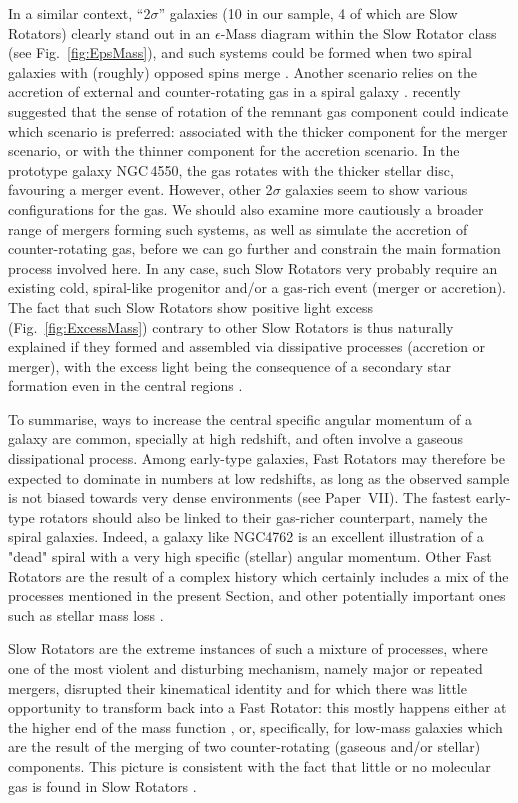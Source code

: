 \documentclass[useAMS,usenatbib,usegraphicx]{mn2e}
\begin{document}
In a similar context, ``2$\sigma$'' galaxies (10 in our sample, 4 of which are Slow Rotators)
clearly stand out in an $\epsilon$-Mass diagram within the Slow Rotator class (see Fig.~\ref{fig:EpsMass}),
and such systems could be formed when two spiral galaxies with (roughly) opposed spins merge \citep{Crocker+09}. 
Another scenario relies on the accretion of external and counter-rotating gas in
a spiral galaxy \citep{Rubin+92}. \cite{Crocker+09} recently suggested that the sense
of rotation of the remnant gas component could indicate which scenario is
preferred: associated with the thicker component for the merger scenario, or
with the thinner component for the accretion scenario. In the prototype galaxy
NGC\,4550, the gas rotates with the thicker stellar disc, favouring a merger
event. However, other 2$\sigma$ galaxies seem to show various configurations
for the gas. We should also examine more cautiously a broader range of mergers
forming such systems, as well as simulate the accretion of counter-rotating gas,
before we can go further and constrain the main formation process involved here.
In any case, such Slow Rotators very probably require an existing cold, spiral-like
progenitor and/or a gas-rich event (merger or accretion). The fact
that such Slow Rotators show positive light excess (Fig.~\ref{fig:ExcessMass})
contrary to other Slow Rotators is thus naturally explained if 
they formed and assembled via dissipative processes (accretion or merger), with the excess light being
the consequence of a secondary star formation even in the central regions \citep{Mihos+94, Hopkins+09c, Kormendy+09}.

To summarise, ways to increase the central specific angular momentum of a galaxy
are common, specially at high redshift, and often involve a gaseous dissipational process.
Among early-type galaxies, Fast Rotators may therefore be expected to 
dominate in numbers at low redshifts, as long as the observed sample is not biased
towards very dense environments (see Paper~VII).
The fastest early-type rotators should also be
linked to their gas-richer counterpart, namely the spiral galaxies. Indeed, a
galaxy like NGC4762 is an excellent illustration of a "dead" spiral with a very
high specific (stellar) angular momentum. Other Fast Rotators are the result of
a complex history which certainly includes a mix of the processes mentioned in
the present Section, and other potentially important ones such as stellar mass
loss \citep[see e.g.][]{MartigBournaud10}. 

Slow Rotators are the extreme instances 
of such a mixture of processes, where one of the most violent and disturbing mechanism, namely
major or repeated mergers, disrupted their kinematical identity and for which
there was little opportunity to transform back into a Fast Rotator: this mostly
happens either at the higher end of the mass function \citep[e.g.][]{Khochfar+06,
Oser+10}, or, specifically, for low-mass galaxies which are the result of the merging of two counter-rotating 
(gaseous and/or stellar) components. This picture is consistent with the fact
that little or no molecular gas is found in Slow Rotators \citep[][Paper~IV]{Young+11}.
\end{document}
